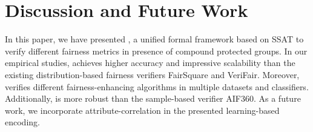 \section{Discussion and Future Work}
In this paper, we have presented {\framework}, a unified formal framework based on SSAT to verify different fairness metrics in presence of compound protected groups. In our empirical studies, {\framework} achieves higher accuracy and impressive scalability than the existing distribution-based fairness verifiers FairSquare and VeriFair. Moreover, {\framework} verifies different fairness-enhancing algorithms in multiple datasets and classifiers. Additionally, {\framework} is more robust than the sample-based verifier AIF360. As a future work, we incorporate attribute-correlation in the presented learning-based encoding. 